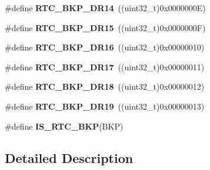 \begin{DoxyCompactItemize}
\item 
\hypertarget{group___r_t_c___backup___registers___definitions_ga718011f7c07a8a734fd51de0161fcddb}{}\#define {\bfseries R\+T\+C\+\_\+\+B\+K\+P\+\_\+\+D\+R14}~((uint32\+\_\+t)0x0000000\+E)\label{group___r_t_c___backup___registers___definitions_ga718011f7c07a8a734fd51de0161fcddb}

\item 
\hypertarget{group___r_t_c___backup___registers___definitions_ga01ad7db765e52ecd13f24bb09db27789}{}\#define {\bfseries R\+T\+C\+\_\+\+B\+K\+P\+\_\+\+D\+R15}~((uint32\+\_\+t)0x0000000\+F)\label{group___r_t_c___backup___registers___definitions_ga01ad7db765e52ecd13f24bb09db27789}

\item 
\hypertarget{group___r_t_c___backup___registers___definitions_ga767f5e169b56f4a2364deb705d322a7b}{}\#define {\bfseries R\+T\+C\+\_\+\+B\+K\+P\+\_\+\+D\+R16}~((uint32\+\_\+t)0x00000010)\label{group___r_t_c___backup___registers___definitions_ga767f5e169b56f4a2364deb705d322a7b}

\item 
\hypertarget{group___r_t_c___backup___registers___definitions_gabba03a6ab599f5f45db95244500177ff}{}\#define {\bfseries R\+T\+C\+\_\+\+B\+K\+P\+\_\+\+D\+R17}~((uint32\+\_\+t)0x00000011)\label{group___r_t_c___backup___registers___definitions_gabba03a6ab599f5f45db95244500177ff}

\item 
\hypertarget{group___r_t_c___backup___registers___definitions_ga9fc8a8a86892e0c517a56b2804b53006}{}\#define {\bfseries R\+T\+C\+\_\+\+B\+K\+P\+\_\+\+D\+R18}~((uint32\+\_\+t)0x00000012)\label{group___r_t_c___backup___registers___definitions_ga9fc8a8a86892e0c517a56b2804b53006}

\item 
\hypertarget{group___r_t_c___backup___registers___definitions_ga384af548d7386c490e6a65b2600c8c2b}{}\#define {\bfseries R\+T\+C\+\_\+\+B\+K\+P\+\_\+\+D\+R19}~((uint32\+\_\+t)0x00000013)\label{group___r_t_c___backup___registers___definitions_ga384af548d7386c490e6a65b2600c8c2b}

\item 
\#define {\bfseries I\+S\+\_\+\+R\+T\+C\+\_\+\+B\+K\+P}(B\+K\+P)
\end{DoxyCompactItemize}


\subsection{Detailed Description}


